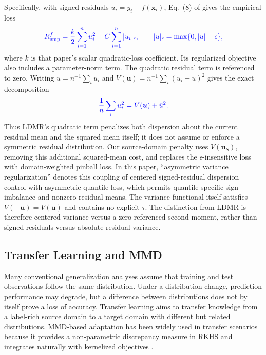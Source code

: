 \documentclass[a4paper]{cas-sc}
\begin{document}
{\color{blue}Specifically, with signed residuals $u_i=y_i-f(\boldsymbol{x}_i)$, Eq.~(8) of \citet{rastogi2020ldmr} gives the empirical loss}
\[
\color{blue}
R_{\mathrm{emp}}^f=\frac{k}{2}\sum_{i=1}^{n}u_i^2+C\sum_{i=1}^{n}|u_i|_\epsilon,
\qquad |u|_\epsilon=\max\{0,|u|-\epsilon\},
\]
{\color{blue}where $k$ is that paper's scalar quadratic-loss coefficient. Its regularized objective also includes a parameter-norm term. The quadratic residual term is referenced to zero. Writing $\bar u=n^{-1}\sum_i u_i$ and $V(\boldsymbol{u})=n^{-1}\sum_i(u_i-\bar u)^2$ gives the exact decomposition}
\[
\color{blue}
\frac{1}{n}\sum_i u_i^2=V(\boldsymbol{u})+\bar u^2.
\]
{\color{blue}Thus LDMR's quadratic term penalizes both dispersion about the current residual mean and the squared mean itself; it does not assume or enforce a symmetric residual distribution. Our source-domain penalty uses $V(\boldsymbol{u}_S)$, removing this additional squared-mean cost, and replaces the $\epsilon$-insensitive loss with domain-weighted pinball loss. In this paper, ``asymmetric variance regularization'' denotes this coupling of centered signed-residual dispersion control with asymmetric quantile loss, which permits quantile-specific sign imbalance and nonzero residual means. The variance functional itself satisfies $V(-\boldsymbol{u})=V(\boldsymbol{u})$ and contains no explicit $\tau$. The distinction from LDMR is therefore centered variance versus a zero-referenced second moment, rather than signed residuals versus absolute-residual variance.}


\subsection{Transfer Learning and MMD}
{\color{blue}Many conventional generalization analyses assume that training and test observations follow the same distribution. Under a distribution change, prediction performance may degrade, but a difference between distributions does not by itself prove a loss of accuracy.} Transfer learning aims to transfer knowledge from a label-rich source domain to a target domain with different but related distributions.
MMD-based adaptation has been widely used in transfer scenarios because it provides a non-parametric discrepancy measure in RKHS and integrates naturally with kernelized objectives \citep{TAO20123962, YAN2022107664, GUO2022118237, dp2, ss2}.
\end{document}
